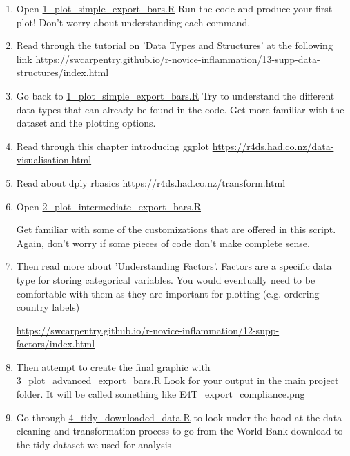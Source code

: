\documentclass{article}
\begin{document}
\begin{enumerate}
\item Open \url{1_plot_simple_export_bars.R}
  Run the code and produce your first plot! Don't worry about
  understanding each command.

  \item Read through the tutorial on 'Data Types and Structures' at
    the following link
    \url{https://swcarpentry.github.io/r-novice-inflammation/13-supp-data-structures/index.html}

    \item Go back to  \url{1_plot_simple_export_bars.R}
  Try to understand the different data types that can already be found
  in the code. Get more familiar with the dataset and the plotting options.

 
  \item Read through this chapter introducing ggplot
    \url{https://r4ds.had.co.nz/data-visualisation.html}

      \item Read about dply rbasics
    \url{https://r4ds.had.co.nz/transform.html}

    
  \item Open \url{2_plot_intermediate_export_bars.R}

    Get familiar with some of the customizations that are offered in
    this script. Again, don't worry if some pieces of code don't make
    complete sense.
    
      \item Then read more about 'Understanding Factors'. Factors are a
    specific data type for storing categorical variables. You would
    eventually need to be comfortable with them as they are important
    for plotting (e.g. ordering country labels)
    
    \url{https://swcarpentry.github.io/r-novice-inflammation/12-supp-factors/index.html}
    
       \item Then attempt to create the final graphic with \url{3_plot_advanced_export_bars.R}
      Look for your output in the main project folder. It will be
      called something like \url{E4T_export_compliance.png}

      \item Go through \url{4_tidy_downloaded_data.R} to look under
        the hood at the data cleaning and transformation
        process to go from the World Bank download to the tidy dataset
        we used for analysis
\end{enumerate}
\end{document}
